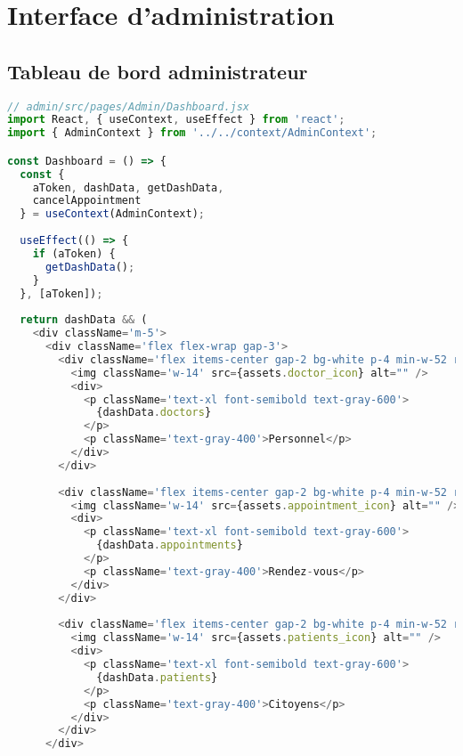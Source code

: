 \section{Interface d'administration}

\subsection{Tableau de bord administrateur}

\begin{lstlisting}[language=JavaScript, caption=Dashboard admin]
// admin/src/pages/Admin/Dashboard.jsx
import React, { useContext, useEffect } from 'react';
import { AdminContext } from '../../context/AdminContext';

const Dashboard = () => {
  const { 
    aToken, dashData, getDashData, 
    cancelAppointment 
  } = useContext(AdminContext);
  
  useEffect(() => {
    if (aToken) {
      getDashData();
    }
  }, [aToken]);
  
  return dashData && (
    <div className='m-5'>
      <div className='flex flex-wrap gap-3'>
        <div className='flex items-center gap-2 bg-white p-4 min-w-52 rounded border-2 border-gray-100 cursor-pointer hover:scale-105 transition-all'>
          <img className='w-14' src={assets.doctor_icon} alt="" />
          <div>
            <p className='text-xl font-semibold text-gray-600'>
              {dashData.doctors}
            </p>
            <p className='text-gray-400'>Personnel</p>
          </div>
        </div>
        
        <div className='flex items-center gap-2 bg-white p-4 min-w-52 rounded border-2 border-gray-100 cursor-pointer hover:scale-105 transition-all'>
          <img className='w-14' src={assets.appointment_icon} alt="" />
          <div>
            <p className='text-xl font-semibold text-gray-600'>
              {dashData.appointments}
            </p>
            <p className='text-gray-400'>Rendez-vous</p>
          </div>
        </div>
        
        <div className='flex items-center gap-2 bg-white p-4 min-w-52 rounded border-2 border-gray-100 cursor-pointer hover:scale-105 transition-all'>
          <img className='w-14' src={assets.patients_icon} alt="" />
          <div>
            <p className='text-xl font-semibold text-gray-600'>
              {dashData.patients}
            </p>
            <p className='text-gray-400'>Citoyens</p>
          </div>
        </div>
      </div>
      

\end{lstlisting}
